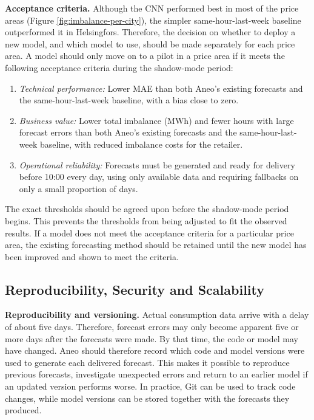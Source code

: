 \documentclass[11pt,a4paper]{article}
\begin{document}
\textbf{Acceptance criteria.} Although the CNN performed best in most of the price areas (Figure \ref{fig:imbalance-per-city}), the simpler same-hour-last-week baseline outperformed it in Helsingfors. Therefore, the decision on whether to deploy a new model, and which model to use, should be made separately for each price area. A model should only move on to a pilot in a price area if it meets the following acceptance criteria during the shadow-mode period:

\begin{enumerate}
    \item \textit{Technical performance:} Lower MAE than both Aneo's existing forecasts and the same-hour-last-week baseline, with a bias close to zero.
    \item \textit{Business value:} Lower total imbalance (MWh) and fewer hours with large forecast errors than both Aneo's existing forecasts and the same-hour-last-week baseline, with reduced imbalance costs for the retailer.

    \item \textit{Operational reliability:} Forecasts must be generated and ready for delivery before 10:00 every day, using only available data and requiring fallbacks on only a small proportion of days.
\end{enumerate}

The exact thresholds should be agreed upon before the shadow-mode period begins. This prevents the thresholds from being adjusted to fit the observed results. If a model does not meet the acceptance criteria for a particular price area, the existing forecasting method should be retained until the new model has been improved and shown to meet the criteria.

\subsection{Reproducibility, Security and Scalability}

\textbf{Reproducibility and versioning.} Actual consumption data arrive with a delay of about five days. Therefore, forecast errors may only become apparent five or more days after the forecasts were made. By that time, the code or model may have changed. Aneo should therefore record which code and model versions were used to generate each delivered forecast. This makes it possible to reproduce previous forecasts, investigate unexpected errors and return to an earlier model if an updated version performs worse. In practice, Git can be used to track code changes, while model versions can be stored together with the forecasts they produced.
\end{document}
